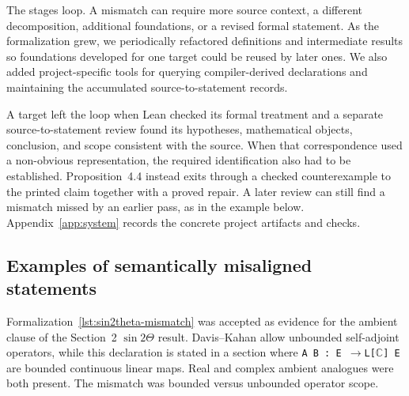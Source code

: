 \documentclass{article}
\begin{document}
The stages loop.  A mismatch can require more source context, a different
decomposition, additional foundations, or a revised formal statement.  As the
formalization grew, we periodically refactored definitions and intermediate
results so foundations developed for one target could be reused by later ones.
We also added project-specific tools for querying compiler-derived declarations
and maintaining the accumulated source-to-statement records.

A target left the loop when Lean checked its formal treatment and a separate
source-to-statement review found its hypotheses, mathematical objects,
conclusion, and scope consistent with the source.  When that correspondence
used a non-obvious representation, the required identification also had to be
established.  Proposition~4.4 instead exits through a checked counterexample to
the printed claim together with a proved repair.  A later review can still find
a mismatch missed by an earlier pass, as in the example below.
Appendix~\ref{app:system} records the concrete project artifacts and checks.

\subsection{Examples of semantically misaligned statements}
\label{sec:scope-mismatch}

Formalization~\ref{lst:sin2theta-mismatch} was accepted as evidence for the
ambient clause of the Section~2 $\sin 2\Theta$ result.  Davis--Kahan allow
unbounded self-adjoint operators, while this declaration is stated in a section
where \texttt{A B : E $\to$L[$\mathbb C$] E} are bounded continuous linear maps.
Real and complex ambient analogues were both present.  The mismatch was bounded
versus unbounded operator scope.
\end{document}
